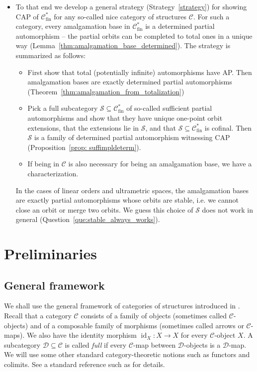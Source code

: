 \documentclass[10pt,a4paper]{article}
\theoremstyle{definition}
\theoremstyle{remark}
\newcommand \maps {\colon} %
\newcommand \id [1]{{\operatorname{id}_{#1}}}
\newcommand \subs {\subseteq}
\newcommand \Su {\mathscr{S}}
\newcommand \C {\mathscr{C}}
\newcommand \D {\mathscr{D}}
\newcommand \fin {{\operatorname{fin}}}
\begin{document}
\begin{itemize}
    \item To that end we develop a general strategy (Strategy~\ref{strategy}) for showing CAP of $\C^*_\fin$ for any so-called nice category of structures $\C$.
    For such a category, every amalgamation base in $\C^*_\fin$ is a determined partial automorphism -- the partial orbits can be completed to total ones in a unique way (Lemma~\ref{thm:amalgamation_base_determined}).
    The strategy is summarized as follows:
    \begin{itemize}
        \item First show that total (potentially infinite) automorphisms have AP.
        Then amalgamation bases are exactly determined partial automorphisms (Theorem~\ref{thm:amalgamation_from_totalization})
        \item Pick a full subcategory $\Su \subs \C^*_\fin$ of so-called sufficient partial automorphisms and show that they have unique one-point orbit extensions, that the extensions lie in $\Su$, and that $\Su \subs \C^*_\fin$ is cofinal.
        Then $\Su$ is a family of determined partial automorphism witnessing CAP (Proposition~\ref{prop: suffimpldeterm}).
        \item If being in $\C$ is also necessary for being an amalgamation base, we have a characterization.
    \end{itemize}
    In the cases of linear orders and ultrametric spaces, the amalgamation bases are exactly partial automorphisms whose orbits are stable, i.e. we cannot close an orbit or merge two orbits.
    We guess this choice of $\Su$ does not work in general (Question~\ref{que:stable_always_works}).
\end{itemize}



\section{Preliminaries}


\subsection{General framework}

We shall use the general framework of categories of structures introduced in \cite{paper1}.
Recall that a category $\C$ consists of a family of objects (sometimes called $\C$-objects) and of a composable family of morphisms (sometimes called arrows or $\C$-maps).
We also have the identity morphism $\id{X}\maps X \to X$ for every $\C$-object $X$.
A subcategory $\D \subseteq \C$ is called \emph{full} if every $\C$-map between $\D$-objects is a $\D$-map.
We will use some other standard category-theoretic notions such as functors and colimits. See a standard reference such as \cite{MacLane} for details.
\end{document}
